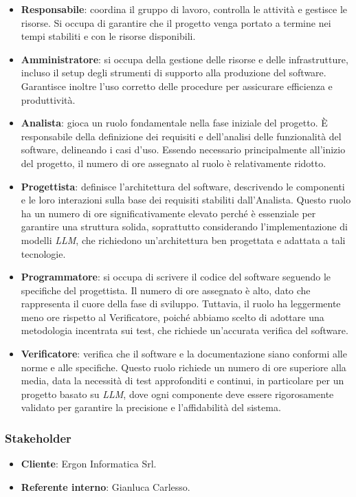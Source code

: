 \documentclass{article}
\begin{document}
        \begin{itemize}
            \item \textbf{Responsabile}: coordina il gruppo di lavoro, controlla le attività e gestisce le risorse. Si occupa di garantire che il progetto venga portato a termine nei tempi stabiliti e con le risorse disponibili.
            \item \textbf{Amministratore}: si occupa della gestione delle risorse e delle infrastrutture, incluso il setup degli strumenti di supporto alla produzione del software. Garantisce inoltre l’uso corretto delle procedure per assicurare efficienza e produttività.
            \item \textbf{Analista}: gioca un ruolo fondamentale nella fase iniziale del progetto. È responsabile della definizione dei requisiti e dell’analisi delle funzionalità del software, delineando i casi d'uso. Essendo necessario principalmente all'inizio del progetto, il numero di ore assegnato al ruolo è relativamente ridotto.
            \item \textbf{Progettista}: definisce l'architettura del software, descrivendo le componenti e le loro interazioni sulla base dei requisiti stabiliti dall'Analista. Questo ruolo ha un numero di ore significativamente elevato perché è essenziale per garantire una struttura solida, soprattutto considerando l’implementazione di modelli \emph{LLM}, che richiedono un'architettura ben progettata e adattata a tali tecnologie.
            \item \textbf{Programmatore}: si occupa di scrivere il codice del software seguendo le specifiche del progettista. Il numero di ore assegnato è alto, dato che rappresenta il cuore della fase di sviluppo. Tuttavia, il ruolo ha leggermente meno ore rispetto al Verificatore, poiché abbiamo scelto di adottare una metodologia incentrata sui test, che richiede un’accurata verifica del software.
            \item \textbf{Verificatore}: verifica che il software e la documentazione siano conformi alle norme e alle specifiche. Questo ruolo richiede un numero di ore superiore alla media, data la necessità di test approfonditi e continui, in particolare per un progetto basato su \emph{LLM}, dove ogni componente deve essere rigorosamente validato per garantire la precisione e l’affidabilità del sistema.
        \end{itemize}
        \subsubsection{Stakeholder}
        \begin{itemize}
            \item \textbf{Cliente}: Ergon Informatica Srl.
            \item \textbf{Referente interno}: Gianluca Carlesso.
        \end{itemize}
\end{document}
